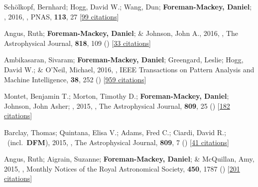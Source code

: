 \item[{\color{numcolor}\scriptsize16}] Sch{\"o}lkopf, Bernhard; Hogg, David W.; Wang, Dun; \textbf{Foreman-Mackey, Daniel}; \etal, 2016, , PNAS, \textbf{113}, 27 [\href{https://scholar.google.com/scholar?cites=2429561747341807338}{99 citations}]

\item[{\color{numcolor}\scriptsize15}] Angus, Ruth; \textbf{Foreman-Mackey, Daniel}; \& Johnson, John A., 2016, , The Astrophysical Journal, \textbf{818}, 109 () [\href{https://ui.adsabs.harvard.edu/abs/2016ApJ...818..109A}{33 citations}]

\item[{\color{numcolor}\scriptsize14}] Ambikasaran, Sivaram; \textbf{Foreman-Mackey, Daniel}; Greengard, Leslie; Hogg, David W.; \& O'Neil, Michael, 2016, , IEEE Transactions on Pattern Analysis and Machine Intelligence, \textbf{38}, 252 () [\href{https://scholar.google.com/scholar?cites=7122560326210979193,5194420368165307096,3347404430934682534}{959 citations}]

\item[{\color{numcolor}\scriptsize13}] Montet, Benjamin T.; Morton, Timothy D.; \textbf{Foreman-Mackey, Daniel}; Johnson, John Asher; \etal, 2015, , The Astrophysical Journal, \textbf{809}, 25 () [\href{https://ui.adsabs.harvard.edu/abs/2015ApJ...809...25M}{182 citations}]

\item[{\color{numcolor}\scriptsize12}] Barclay, Thomas; Quintana, Elisa V.; Adams, Fred C.; Ciardi, David R.; \etal\ (incl.\ \textbf{DFM}), 2015, , The Astrophysical Journal, \textbf{809}, 7 () [\href{https://ui.adsabs.harvard.edu/abs/2015ApJ...809....7B}{41 citations}]

\item[{\color{numcolor}\scriptsize11}] Angus, Ruth; Aigrain, Suzanne; \textbf{Foreman-Mackey, Daniel}; \& McQuillan, Amy, 2015, , Monthly Notices of the Royal Astronomical Society, \textbf{450}, 1787 () [\href{https://ui.adsabs.harvard.edu/abs/2015MNRAS.450.1787A}{201 citations}]

